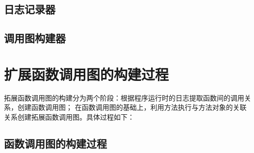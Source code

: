 \subsection{日志记录器}

\subsection{调用图构建器}

\section{扩展函数调用图的构建过程}

拓展函数调用图的构建分为两个阶段：根据程序运行时的日志提取函数间的调用关系，创建函数调用图；
在函数调用图的基础上，利用方法执行与方法对象的关联关系创建拓展函数调用图。具体过程如下：

\subsection{函数调用图的构建过程}

